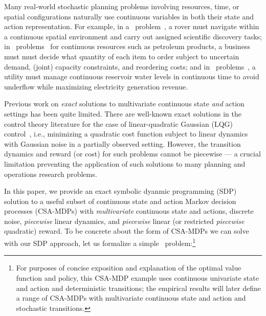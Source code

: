 \label{sec:intro}

Many real-world stochastic planning problems involving resources,
time, or spatial configurations naturally use continuous variables in
both their state and action representation.  For example, in a
\MarsRover\ problem~\cite{bresina02}, a rover must navigate within a
continuous spatial environment and carry out assigned scientific
discovery tasks; in \InventoryControl\ problems~\cite{Mahootchi2009}
for continuous resources such as petroleum products, a business must
must decide what quantity of each item to order subject to uncertain
demand, (joint) capacity constraints, and reordering costs; and in
\WaterReservoir\ problems~\cite{reservoir}, a utility must manage continuous
reservoir water levels in continuous time to avoid underflow 
while maximizing electricity generation revenue.

Previous work on \emph{exact} solutions to multivariate continuous
state \emph{and} action settings has been quite limited.  There are
well-known exact solutions in the control theory literature for the
case of linear-quadratic Gaussian (LQG) control~\cite{lqgc}, i.e.,
minimizing a quadratic cost function subject to linear dynamics with
Gaussian noise in a partially observed setting.  However, the
transition dynamics and reward (or cost) for such problems 
cannot be piecewise --- a crucial limitation preventing the application
of such solutions to many planning and operations research problems. 

In this paper, we provide an exact symbolic dyanmic programming (SDP)
solution to a useful subset of continuous state and action Markov
decision processes (CSA-MDPs) with \emph{multivariate} continuous
state and actions, discrete noise, \emph{piecewise} linear dynamics,
and \emph{piecewise} linear (or restricted \emph{piecewise} quadratic)
reward.  To be concrete about the form of CSA-MDPs we can solve with
our SDP approach, let us formalize a simple \MarsRover\
problem:\footnote{For purposes of concise exposition and explanation
of the optimal value function and policy, this CSA-MDP example uses
continuous univariate state and action and deterministic transitions;
the empirical results will later define a range of CSA-MDPs with
multivariate continuous state and action and stochastic transitions.}

